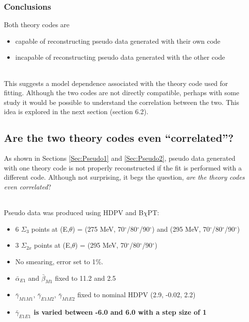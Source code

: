 \documentclass[]{article}
\begin{document}
\vspace{10mm}
\subsubsection{Conclusions}

Both theory codes are
\begin{itemize}
	\item capable of reconstructing pseudo data generated with their own code
	\item incapable of reconstructing pseudo data generated with the other code
\end{itemize}  

\noindent \\ This suggests a model dependence associated with the theory code used for fitting. Although the two codes are not directly compatible, perhaps with some study it would be possible to understand the correlation between the two. This idea is explored in the next section (section 6.2).

\newpage
\subsection{Are the two theory codes even \enquote{correlated}?} \label{Sec:pseu_highE}
As shown in Sections \ref{Sec:Pseudo1} and \ref{Sec:Pseudo2}, pseudo data generated with one theory code is not properly reconstructed if the fit is performed with a different code. Although not surprising, it begs the question, \textit{are the theory codes even correlated}? 

\noindent \\Pseudo data was produced using HDPV and B$\chi$PT:
\begin{itemize}
	\item 6 $\Sigma_{3}$ points at (E,$\theta$) = (275 MeV, 70$^\circ$/80$^\circ$/90$^\circ$) and (295 MeV, 70$^\circ$/80$^\circ$/90$^\circ$)
	\item 3 $\Sigma_{2x}$ points at (E,$\theta$) = (295 MeV, 70$^\circ$/80$^\circ$/90$^\circ$)
	\item No smearing, error set to 1$\%$. 
	\item $\bar{\alpha}_{E1}$ and $\bar{\beta}_{M1}$ fixed to 11.2 and 2.5
	\item $\bar{\gamma}_{M1M1}$, $\bar{\gamma}_{E1M2}$, $\bar{\gamma}_{M1E2}$ fixed to nominal HDPV (2.9, -0.02, 2.2)
	\item \textbf{$\bar{\gamma}_{E1E1}$ is varied between -6.0 and 6.0 with a step size of 1}
\end{itemize}
\end{document}
